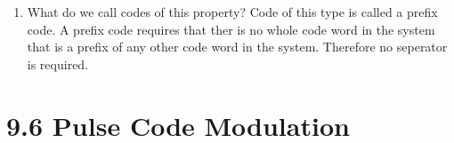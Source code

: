 \documentclass{article}
\begin{document}
\begin{adjustwidth}{2em}{2em}
\begin{enumerate}
\begin{tabular}{ccc}
			\end{tabular}
			\item What do we call codes of this property?
			Code of this type is called a prefix code. A prefix code requires that ther is no whole code word in the system that is a prefix of any other code word in the system. Therefore no seperator is required.
		\end{enumerate}
	\end{adjustwidth}
	
	\section*{9.6 Pulse Code Modulation}
	\begin{adjustwidth}{2em}{2em}
	\end{adjustwidth}
\end{document}
